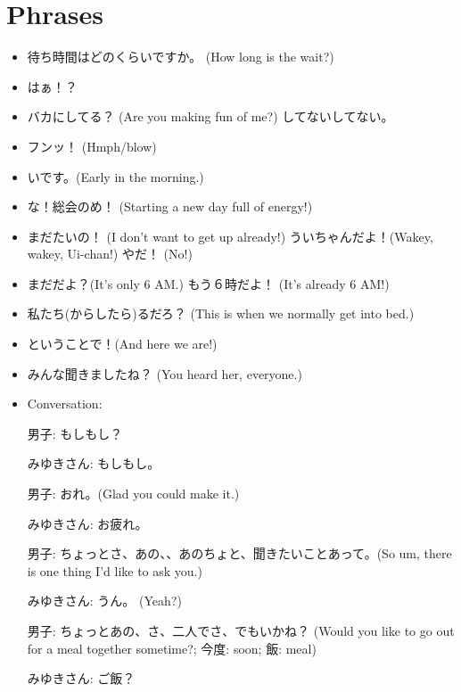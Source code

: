 \documentclass[../nihongo-gakushuu-kyouzai-grammar.tex]{subfiles}
\begin{document}
\appendix
\setcounter{section}{1}
\section{Phrases}

\begin{itemize}
    \item 待ち時間はどのくらいですか。 (How long is the wait?)
    \item はぁ！？
    \item バカにしてる？ (Are you making fun of me?) してないしてない。
    \item フンッ！ (Hmph/blow)
    \item {}いです。(Early in the morning.)
    \item {}な！総会のめ！ (Starting a new day full of energy!)
    \item まだたいの！ (I don't want to get up already!) ういちゃんだよ！(Wakey, wakey, Ui-chan!) やだ！ (No!)
    \item まだだよ？(It's only 6 AM.) もう６時だよ！ (It's already 6 AM!)
    \item 私たち(からしたら)るだろ？ (This is when we normally get into bed.)
    \item ということで！(And here we are!)
    \item みんな聞きましたね？ (You heard her, everyone.)

    \item Conversation: %

    男子: もしもし？

    みゆきさん: もしもし。

    男子: おれ。(Glad you could make it.)

    みゆきさん: お疲れ。

    男子: ちょっとさ、あの、、あのちょと、聞きたいことあって。(So um, there is one thing I'd like to ask you.)

    みゆきさん: うん。 (Yeah?)

    男子: ちょっとあの、さ、二人でさ、でもいかね？ (Would you like to go out for a meal together sometime?; 今度: soon; 飯: meal)

    みゆきさん: ご飯？


\end{itemize}
\end{document}
